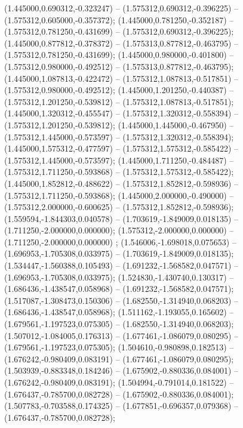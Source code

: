  (1.445000,0.690312,-0.323247) -- (1.575312,0.690312,-0.396225) -- (1.575312,0.605000,-0.357372);
 (1.445000,0.781250,-0.352187) -- (1.575312,0.781250,-0.431699) -- (1.575312,0.690312,-0.396225);
 (1.445000,0.877812,-0.378372) -- (1.575313,0.877812,-0.463795) -- (1.575312,0.781250,-0.431699);
 (1.445000,0.980000,-0.401800) -- (1.575312,0.980000,-0.492512) -- (1.575313,0.877812,-0.463795);
 (1.445000,1.087813,-0.422472) -- (1.575312,1.087813,-0.517851) -- (1.575312,0.980000,-0.492512);
 (1.445000,1.201250,-0.440387) -- (1.575312,1.201250,-0.539812) -- (1.575312,1.087813,-0.517851);
 (1.445000,1.320312,-0.455547) -- (1.575312,1.320312,-0.558394) -- (1.575312,1.201250,-0.539812);
 (1.445000,1.445000,-0.467950) -- (1.575312,1.445000,-0.573597) -- (1.575312,1.320312,-0.558394);
 (1.445000,1.575312,-0.477597) -- (1.575312,1.575312,-0.585422) -- (1.575312,1.445000,-0.573597);
 (1.445000,1.711250,-0.484487) -- (1.575312,1.711250,-0.593868) -- (1.575312,1.575312,-0.585422);
 (1.445000,1.852812,-0.488622) -- (1.575312,1.852812,-0.598936) -- (1.575312,1.711250,-0.593868);
 (1.445000,2.000000,-0.490000) -- (1.575312,2.000000,-0.600625) -- (1.575312,1.852812,-0.598936);
 (1.559594,-1.844303,0.040578) -- (1.703619,-1.849009,0.018135) -- (1.711250,-2.000000,0.000000);
 (1.575312,-2.000000,0.000000) -- (1.711250,-2.000000,0.000000) ;
 (1.546006,-1.698018,0.075653) -- (1.696953,-1.705308,0.033975) -- (1.703619,-1.849009,0.018135);
 (1.534447,-1.560388,0.105493) -- (1.691232,-1.568582,0.047571) -- (1.696953,-1.705308,0.033975);
 (1.524830,-1.430740,0.130317) -- (1.686436,-1.438547,0.058968) -- (1.691232,-1.568582,0.047571);
 (1.517087,-1.308473,0.150306) -- (1.682550,-1.314940,0.068203) -- (1.686436,-1.438547,0.058968);
 (1.511162,-1.193055,0.165602) -- (1.679561,-1.197523,0.075305) -- (1.682550,-1.314940,0.068203);
 (1.507012,-1.084005,0.176313) -- (1.677461,-1.086079,0.080295) -- (1.679561,-1.197523,0.075305);
 (1.504610,-0.980898,0.182513) -- (1.676242,-0.980409,0.083191) -- (1.677461,-1.086079,0.080295);
 (1.503939,-0.883348,0.184246) -- (1.675902,-0.880336,0.084001) -- (1.676242,-0.980409,0.083191);
 (1.504994,-0.791014,0.181522) -- (1.676437,-0.785700,0.082728) -- (1.675902,-0.880336,0.084001);
 (1.507783,-0.703588,0.174325) -- (1.677851,-0.696357,0.079368) -- (1.676437,-0.785700,0.082728);
